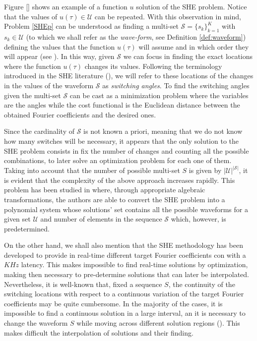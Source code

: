 Figure \ref{} shows an example of a function $u$ solution of the SHE problem. Notice that the values of $u(\tau)\in\mathcal U$ can be repeated. With this observation in mind, Problem \ref{SHEp} can be understood as finding a multi-set $\mathcal S = \{s_k\}_{k=1}^K$ with $s_k\in\mathcal U$ (to which we shall refer as the \textit{wave-form}, see Definition \ref{def:waveform}) defining the values that the function $u(\tau)$ will assume and in which order they will appear (see \cite{Konstantinou2010}). In this way, given $\mathcal S$ we can focus in finding the exact locations where the function $u(\tau)$ changes its values. Following the terminology introduced in the SHE literature (\cite{Yang2015,Konstantinou2010,Sun1996}), we will refer to these locations of the changes in the values of the waveform $\mathcal{S}$ as \textit{switching angles}. To find the switching angles given the multi-set $\mathcal S$ can be cast as a minimization problem where the variables are the angles while the cost functional is the Euclidean distance between the obtained Fourier coefficients and the desired ones.

Since the cardinality of $\mathcal S$ is not known a priori, meaning that we do not know how many switches will be necessary, it appears that the only solution to the SHE problem consists in fix the number of changes and counting all the possible combinations, to later solve an optimization problem for each one of them.
%
Taking into account that the number of possible multi-set $S$ is given by $|\mathcal{U}|^{|\mathcal S|}$, it is evident that the complexity of the above approach increases rapidly.
%
This problem has been studied in \cite{Yang2015} where, through appropriate algebraic transformations, the authors are able to convert the SHE problem into a polynomial system whose solutions' set contains all the possible waveforms for a given set $\mathcal{U}$ and number of elements in the sequence $\mathcal S$ which, however, is predetermined. 
%

On the other hand, we shall also mention that the SHE methodology has been developed to provide in real-time different target Fourier coefficients con with a $KHz$ latency. 
%
This makes impossible to find real-time solutions by optimization, making then necessary to pre-determine solutions that can later be interpolated.
%
Nevertheless, it is well-known that, fixed a sequence $S$, the continuity of the switching locations with respect to a continuous variation of the target Fourier coefficients may be quite cumbersome. 
%
In the majority of the cases, it is impossible to find a continuous solution in a large interval, an it is necessary to change the waveform $S$ while moving across different solution regions (\cite{Yang2015,Yang2017}). This makes difficult the interpolation of solutions and their finding.

